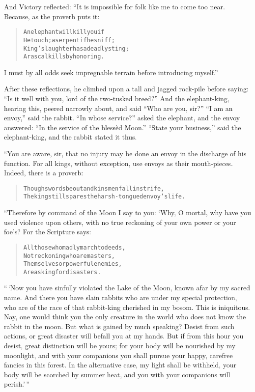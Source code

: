 \documentclass[article, twoside, 14pt]{memoir}
\renewenvironment{verbatim}{%
\begin{quote}%
\vskip -10pt%
\begin{alltt}\normalfont\large}{\end{alltt}%
\end{quote}%
\vskip -10pt
} %
\begin{document}
And Victory reflected: “It is impossible for folk like me to come
too near. Because, as the proverb puts it:

\begin{verbatim}
An elephant will kill you if
He touch; a serpent if he sniff;
King's laughter has a deadly sting;
A rascal kills by honoring.
\end{verbatim}
I must by all odds seek impregnable terrain before introducing
myself.”

After these reflections, he climbed upon a tall and jagged
rock-pile before saying:
``Is it well with you, lord of the two-tusked breed?'' And the
elephant-king, hearing this, peered narrowly about, and said
``Who are you, sir?'' ``I am an envoy,'' said the rabbit.
``In whose service?'' asked the elephant, and the envoy answered:
``In the service of the blessèd Moon.'' ``State your business,''
said the elephant-king, and the rabbit stated it thus.

“You are aware, sir, that no injury may be done an envoy in the
discharge of his function. For all kings, without exception, use
envoys as their mouth-pieces. Indeed, there is a proverb:

\begin{verbatim}
Though swords be out and kinsmen fall in strife,
The king still spares the harsh-tongued envoy's life.
\end{verbatim}
“Therefore by command of the Moon I say to you: ‘Why, O mortal, why
have you used violence upon others, with no true reckoning of your
own power or your foe's? For the Scripture says:

\begin{verbatim}
All those who madly march to deeds,
Not reckoning who are masters,
Themselves or powerful enemies,
Are asking for disasters.
\end{verbatim}
``\,`Now you have sinfully violated the Lake of the Moon, known afar by my sacred name. And there you have slain rabbits who are under my special protection, who are of the race of that rabbit-king cherished in my bosom. This is iniquitous. Nay, one would think you the only creature in the world who does not know the rabbit in the moon. But what is gained by much speaking? Desist from such actions, or great disaster will befall you at my hands. But if from this hour you desist, great distinction will be yours; for your body will be nourished by my moonlight, and with your companions you shall pursue your happy, carefree fancies in this forest. In the alternative case, my light shall be withheld, your body will be scorched by summer heat, and you with your companions will perish.'\,''
\end{document}
